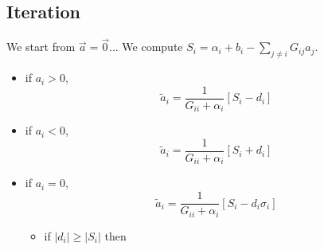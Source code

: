 \documentclass{revtex4}
\newcommand{\abs}[1]{\left|#1\right|}
\begin{document}
\subsection{Iteration}
We start from $\vec{a}=\vec{0}$...
We compute $S_i=\alpha_i + b_i -\sum_{j\not=i}G_{ij} a_j$.
\begin{itemize}
\item if $a_i>0$, 
	\begin{equation}
		\tilde{a}_i = \dfrac{1}{G_{ii}+\alpha_i}
	 	\left\lbrack
	 		S_i - d_i 
	 	\right\rbrack
	\end{equation}
\item if $a_i<0$,
	\begin{equation}
		\tilde{a}_i = \dfrac{1}{G_{ii}+\alpha_i}
	 	\left\lbrack
	 	S_i + d_i
	 	\right\rbrack
	\end{equation}
\item if $a_i=0$, 
	\begin{equation}
		\tilde{a}_i = \dfrac{1}{G_{ii}+\alpha_i}
	 	\left\lbrack
	 	S_i - d_i \sigma_i 
	 	\right\rbrack
	\end{equation}
	\begin{itemize}
	\item if $\abs{d_i}\geq\abs{S_i}$ then
	\end{itemize}
\end{itemize}
\end{document}
